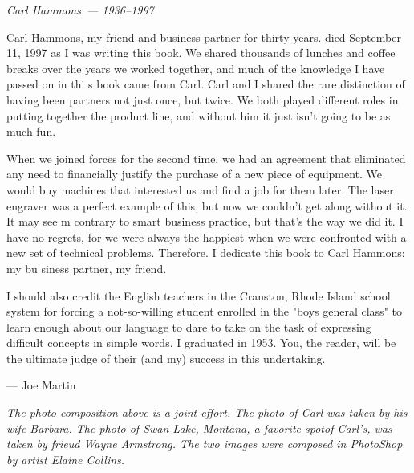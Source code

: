 \secdown
{}\secdown

\textit{Carl Hammons\ --- 1936--1997}
\bigskip

Carl Hammons, my friend and business partner for thirty years. died September
11, 1997 as I was writing this book. We shared thousands of lunches and coffee
breaks over the years we worked together, and much of the knowledge I have
passed on in thi s book came from Carl. Carl and I shared the rare distinction
of having been partners not just once, but twice. We both played different roles
in putting together the product line, and without him it just isn't going to be
as much fun.

When we joined forces for the second time, we had an agreement that eliminated
any need to financially justify the purchase of a new piece of equipment.
We would buy machines that interested us and find a job for them later. The
laser engraver was a perfect example of this, but now we couldn't get along
without it. It may see m contrary to smart business practice, but that's the
way we did it. I have no regrets, for we were always the happiest when we were
confronted with a new set of technical problems. Therefore. I dedicate this book
to Carl Hammons: my bu siness partner, my friend.

\bigskip
I should also credit the English teachers in the Cranston, Rhode Island school
system for forcing a not-so-willing student enrolled in the "boys general class"
to learn enough about our language to dare to take on the task of expressing
difficult concepts in simple words. I graduated in 1953. You, the reader, will
be the ultimate judge of their (and my) success in this undertaking.

\bigskip
--- Joe Martin

\bigskip
\textit{The photo composition above is a joint effort.
The photo of Carl was taken by his wife Barbara.
The photo of Swan Lake, Montana, a favorite spotof Carl's, was taken by frieud
Wayne Armstrong. The two images were composed in PhotoShop by artist Elaine
Collins.}

\secup
\secup
